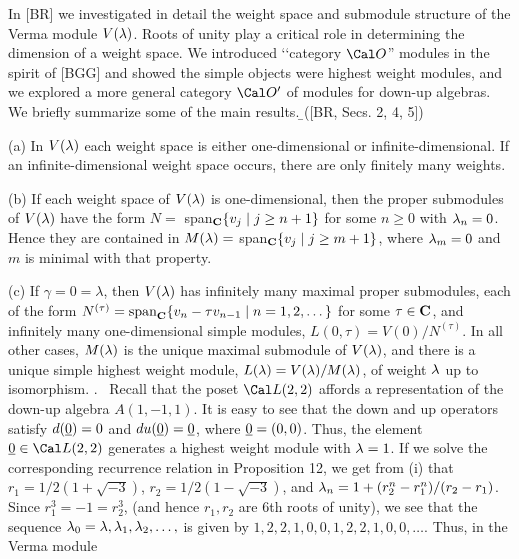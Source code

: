       \m 
      In [BR] we investigated in detail the weight space and submodule structure of the
      Verma module $V(\lambda)$.  Roots of unity play a critical role in determining
      the dimension of a weight space.  We introduced ‘‘category $\Cal O$'' modules
      in the spirit of [BGG] 
      and showed the simple objects were highest weight modules,  and we explored
      a more general category $\Cal O'$ of modules for down-up algebras.
      We briefly summarize some of the main results.
      \b 
      ([BR, Secs. 2, 4, 5]) 
      \item {(a)} In $V(\lambda)$ each weight space is either
      one-dimensional or infinite-dimensional.  If an infinite-dimensional
      weight space occurs, there are only finitely many weights.
      \m
      \item{(b)} If each weight space of $V(\lambda)$ is
      one-dimensional, then the proper submodules of $V(\lambda)$ have the
      form $N =$ span$_{\text {\bf C}}\{v_j \mid j \geq n+1\}$ for some $n \geq  0$ with $\lambda_n = 0$.
      Hence they are contained in $M(\lambda) =$ span$_{\text {\bf C}}\{v_j \mid j \geq m+1\}$,
      where $\lambda_m = 0$ and $m$ is minimal with that property.   
      \m
      \item{(c)} If $\gamma = 0 = \lambda$, then
      $V(\lambda)$ has infinitely many maximal proper submodules, each
      of the form 
      $N^{(\tau)} = \text{span}_{\text {\bf C}}\{v_n -\tau v_{n-1}\mid n = 1,2, \dots\}$
      for some $\tau \in {\text {\bf C}}$, and infinitely many one-dimensional
      simple modules,  $L(0,\tau) = V(0)/N^{(\tau)}$.  In
      all other cases, $M(\lambda)$ is the unique maximal submodule of $V(\lambda)$,
      and there is a unique simple highest weight module,
      $L(\lambda)= V(\lambda)/M(\lambda)$, of weight $\lambda$  up to
      isomorphism. \endproclaim
      \m
      . \   Recall that the poset $\Cal L(2,2)$ affords a
      representation of the down-up algebra $A(1,-1,1)$. It is easy
      to see that the down and up operators satisfy $d(\underline 0) = 0$
      and $du(\underline 0) = \underline 0$, where $\underline 0 = (0,0)$. Thus, the
      element $\u 0 \in \Cal L(2,2)$ generates a highest weight module
      with $\lambda = 1$.     If we solve
      the corresponding recurrence relation in Proposition 12, we get from
      (i) that $r_1 = 1/2(1 + \sqrt{-3})$, $r_2 = 1/2(1 - \sqrt{-3})$,
      and $\lambda_n = 1+ (r_2^n - r_1^n)/(r_2-r_1)$.  Since $r_1^3 = -1 = r_2^3$,
      (and hence $r_1,r_2$ are 6th roots of unity), 
      we see that the sequence $\lambda_0 = \lambda,\lambda_1,\lambda_2, \dots,$ is given
      by $1,2,2,1,0,0,1,2,2,1,0,0,\dots$.  Thus, in the Verma module
